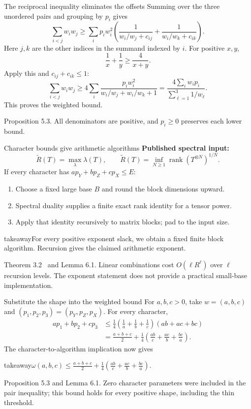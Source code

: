 \documentclass[aspectratio=169,11pt]{beamer}
\newcommand{\rank}{\operatorname{rank}}
\newcommand{\source}[1]{\vfill\par{\fontsize{7.5}{9}\selectfont\color{muted}#1\par}}
\newcommand{\takeaway}[1]{\begin{beamercolorbox}[sep=0.65em,wd=\linewidth]{takeaway}#1\end{beamercolorbox}}
\begin{document}
\begin{frame}{The reciprocal inequality eliminates the offsets}
  Summing over the three unordered pairs and grouping by $p_i$ gives
  \[
    \sum_{i<j}w_iw_j\ge
    \sum_i p_iw_i^2\left(
      \frac1{w_i/w_j+c_{ij}}+\frac1{w_i/w_k+c_{ik}}\right).
  \]
  Here $j,k$ are the other indices in the summand indexed by $i$.
  For positive $x,y$,
  \[
    \frac1x+\frac1y\ge\frac4{x+y}.
  \]
  Apply this and $c_{ij}+c_{ik}\le1$:
  \[
    \sum_{i<j}w_iw_j
    \ge4\sum_i\frac{p_iw_i^2}{w_i/w_j+w_i/w_k+1}
    =\frac{4\sum_iw_ip_i}{\sum_{\ell=1}^3 1/w_\ell}.
  \]
  This proves the weighted bound.
  \source{Proposition 5.3. All denominators are positive, and $p_i\ge0$
  preserves each lower bound.}
\end{frame}

\begin{frame}{Character bounds give arithmetic algorithms}
  \textbf{Published spectral input:}
  \[
    \widetilde R(T)=\max_{\lambda}\lambda(T),\qquad
    \widetilde R(T)=\inf_{N\ge1}\rank(T^{\otimes N})^{1/N}.
  \]
  If every character has $a p_Y+b p_Z+c p_X\le E$:
  \begin{enumerate}
    \item Choose a fixed large base $B$ and round the block dimensions upward.
    \item Spectral duality supplies a finite exact rank identity for a tensor power.
    \item Apply that identity recursively to matrix blocks; pad to the input size.
  \end{enumerate}
  \medskip
  \takeaway{For every positive exponent slack, we obtain a fixed finite
  block algorithm. Recursion gives the claimed arithmetic exponent.}
  \source{Theorem 3.2~\cite{strassen,spectra} and Lemma 6.1.
  Linear combinations cost $O(\ell R^\ell)$ over $\ell$ recursion levels.
  The exponent statement does not provide a practical small-base implementation.}
\end{frame}

\begin{frame}{Substitute the shape into the weighted bound}
  For $a,b,c>0$, take $w=(a,b,c)$ and
  $(p_1,p_2,p_3)=(p_Y,p_Z,p_X)$. For every character,
  \[
  \begin{aligned}
    ap_1+bp_2+cp_3
    &\le\frac14\left(\frac1a+\frac1b+\frac1c\right)(ab+ac+bc)\\[3pt]
    &=\frac{a+b+c}{2}
      +\frac14\left(\frac{ab}{c}+\frac{ac}{b}+\frac{bc}{a}\right).
  \end{aligned}
  \]
  The character-to-algorithm implication now gives
  \takeaway{$\displaystyle
    \omega(a,b,c)\le\frac{a+b+c}{2}
      +\frac14\left(\frac{ab}{c}+\frac{ac}{b}+\frac{bc}{a}\right).
  $}
  \source{Proposition 5.3 and Lemma 6.1.
  Zero character parameters were included in the pair inequality;
  this bound holds for every positive shape, including the thin threshold.}
\end{frame}
\end{document}
